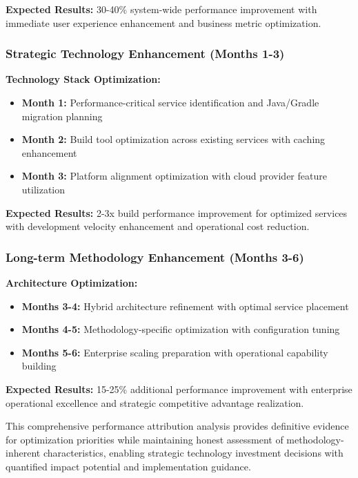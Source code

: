 \textbf{Expected Results:} 30-40\% system-wide performance improvement with immediate user experience enhancement and business metric optimization.

\subsubsection{Strategic Technology Enhancement (Months 1-3)}

\textbf{Technology Stack Optimization:}
\begin{itemize}
\item \textbf{Month 1:} Performance-critical service identification and Java/Gradle migration planning
\item \textbf{Month 2:} Build tool optimization across existing services with caching enhancement
\item \textbf{Month 3:} Platform alignment optimization with cloud provider feature utilization
\end{itemize}

\textbf{Expected Results:} 2-3x build performance improvement for optimized services with development velocity enhancement and operational cost reduction.

\subsubsection{Long-term Methodology Enhancement (Months 3-6)}

\textbf{Architecture Optimization:}
\begin{itemize}
\item \textbf{Months 3-4:} Hybrid architecture refinement with optimal service placement
\item \textbf{Months 4-5:} Methodology-specific optimization with configuration tuning
\item \textbf{Months 5-6:} Enterprise scaling preparation with operational capability building
\end{itemize}

\textbf{Expected Results:} 15-25\% additional performance improvement with enterprise operational excellence and strategic competitive advantage realization.

This comprehensive performance attribution analysis provides definitive evidence for optimization priorities while maintaining honest assessment of methodology-inherent characteristics, enabling strategic technology investment decisions with quantified impact potential and implementation guidance.

